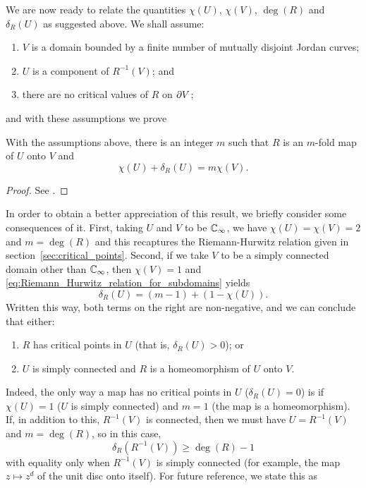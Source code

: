 We are now ready to relate the quantities $\chi(U)$, $\chi(V)$, $\deg(R)$ and
$\delta_R(U)$ as suggested above. We shall assume:
\begin{enumerate}[label=(\arabic*)]
    \item $V$ is a domain bounded by a finite number of mutually disjoint Jordan
    curves;
    \item $U$ is a component of $R^{-1}(V)$; and
    \item there are no critical values of $R$ on $\partial {V}$;
\end{enumerate}
and with these assumptions we prove

\begin{theorem}
    \label{thm:Riemann_Hurwitz_relation_for_subdomains}
    With the assumptions above, there is an integer $m$ such that $R$ is an
    $m$-fold map of $U$ onto $V$ and
    \begin{equation}
        \label{eq:Riemann_Hurwitz_relation_for_subdomains}
        \chi(U) + \delta_R(U) = m \chi(V).
    \end{equation}
\end{theorem}
\begin{proof}
    See \cite[87--89]{Beardon1991}.
\end{proof}

In order to obtain a better appreciation of this result, we briefly consider
some consequences of it. First, taking $U$ and $V$ to be $\mathbb{C}_\infty$, we have
$\chi(U) = \chi(V) = 2$ and $m = \deg(R)$ and this recaptures the
Riemann-Hurwitz relation given in section~\ref{sec:critical_points}. Second, if
we take $V$ to be a simply connected domain other than $\mathbb{C}_\infty$, then $\chi(V) =
1$ and \eqref{eq:Riemann_Hurwitz_relation_for_subdomains} yields
\begin{equation*}
    \delta_R(U) = (m-1) + (1-\chi(U)).
\end{equation*}
Written this way, both terms on the right are non-negative, and we can conclude
that either:
\begin{enumerate}[label=(\roman*)]
    \item $R$ has critical points in $U$ (that is, $\delta_R(U) > 0$); or
    \item $U$ is simply connected and $R$ is a homeomorphism of $U$ onto $V$.
\end{enumerate}
Indeed, the only way a map has no critical points in $U$ ($\delta_R(U)=0$) is if
$\chi(U)=1$ ($U$ is simply connected) and $m=1$ (the map is a homeomorphism).
If, in addition to this, $R^{-1}(V)$ is connected, then we must have $U =
R^{-1}(V)$ and $m = \deg(R)$, so in this case,
\begin{equation*}
    \delta_R(R^{-1}(V)) \geq \deg(R)-1
\end{equation*}
with equality only when $R^{-1}(V)$ is simply connected (for example, the map $z
\mapsto z^d$ of the unit disc onto itself). For future reference, we state this
as

